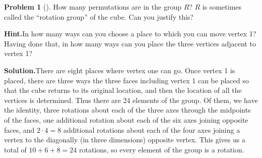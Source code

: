 \documentclass[10pt,]{book}
\theoremstyle{plain}
\theoremstyle{definition}
\newtheorem{activity}[project]{Problem}
\theoremstyle{definition}
\numberwithin{equation}{chapter}
\begin{document}
\begin{activity}[]\label{activity-264}
How many permutations are in the group \(R\)? \(R\) is sometimes called the ``rotation group'' of the cube. Can you justify this?%
\par\medskip\noindent%
\textbf{Hint.}\quad In how many ways can you choose a place to which you can move vertex 1? Having done that, in how many ways can you place the three vertices adjacent to vertex 1?%
\par\medskip\noindent%
\textbf{Solution.}\quad There are eight places where vertex one can go. Once vertex 1 is placed, there are three ways the three faces including vertex 1 can be placed so that the cube returns to its original location, and then the location of all the vertices is determined. Thus there are 24 elements of the group. Of them, we have the identity, three rotations about each of the three axes through the midpoints of the faces, one additional rotation about each of the six axes joining opposite faces, and \(2\cdot 4 = 8\) additional rotations about each of the four axes joining a vertex to the diagonally (in three dimensions) opposite vertex. This gives us a total of \(10+6+8=24\) rotations, so every element of the group is a rotation.%
\end{activity}
\end{document}
